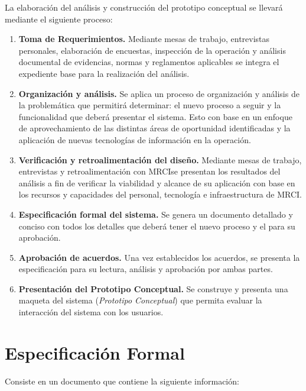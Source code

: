 \documentclass[10pt]{book}
\newcommand{\cliente}{MRCI}
\begin{document}
	La elaboración del análisis y construcción del prototipo conceptual se llevará mediante el siguiente proceso:
	
	
\begin{enumerate}
	\item {\bf Toma de Requerimientos.} Mediante mesas de trabajo, entrevistas personales, elaboración de encuestas, inspección de la operación y análisis documental de evidencias, normas y reglamentos aplicables se integra el expediente base para la realización del análisis.
	\item {\bf Organización y análisis.} Se aplica un proceso de organización y análisis de la problemática que permitirá determinar: el nuevo proceso a seguir y la funcionalidad que deberá presentar el sistema. Esto con base en un enfoque de aprovechamiento de las distintas áreas de oportunidad identificadas y la aplicación de nuevas tecnologías de información en la operación.
	\item {\bf Verificación y retroalimentación del diseño.} Mediante mesas de trabajo, entrevistas y retroalimentación con \cliente se presentan los resultados del análisis a fin de verificar la viabilidad y alcance de su aplicación con base en los recursos y capacidades del personal, tecnología e infraestructura de \cliente.
	\item {\bf Especificación formal del sistema.} Se genera un documento detallado y conciso con todos los detalles que deberá tener el nuevo proceso y el \proyecto para su aprobación.  
	\item {\bf Aprobación de acuerdos.} Una vez establecidos los acuerdos, se presenta la especificación para su lectura, análisis y aprobación por ambas partes.
	\item {\bf Presentación del Prototipo Conceptual.} Se construye y presenta una maqueta del sistema ({\em Prototipo Conceptual}) que permita evaluar la interacción del sistema con los usuarios.
\end{enumerate}

\section{Especificación Formal}

	Consiste en un documento que contiene la siguiente información:
	
\end{document}
